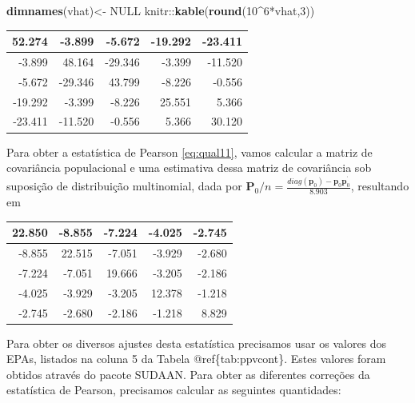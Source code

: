 \documentclass[]{book}
\newenvironment{Shaded}{\begin{snugshade}}{\end{snugshade}}
\newcommand{\KeywordTok}[1]{\textcolor[rgb]{0.13,0.29,0.53}{\textbf{{#1}}}}
\newcommand{\DecValTok}[1]{\textcolor[rgb]{0.00,0.00,0.81}{{#1}}}
\newcommand{\StringTok}[1]{\textcolor[rgb]{0.31,0.60,0.02}{{#1}}}
\newcommand{\OtherTok}[1]{\textcolor[rgb]{0.56,0.35,0.01}{{#1}}}
\newcommand{\NormalTok}[1]{{#1}}
\numberwithin{example}{chapter}
\numberwithin{remark}{chapter}
\numberwithin{definition}{chapter}
\begin{document}
\begin{Shaded}
\begin{Highlighting}[]
\KeywordTok{dimnames}\NormalTok{(vhat)<-}\StringTok{ }\OtherTok{NULL}
\NormalTok{knitr::}\KeywordTok{kable}\NormalTok{(}\KeywordTok{round}\NormalTok{(}\DecValTok{10}\NormalTok{^}\DecValTok{6}\NormalTok{*vhat,}\DecValTok{3}\NormalTok{))}
\end{Highlighting}
\end{Shaded}

\begin{tabular}{r|r|r|r|r}
\hline
52.274 & -3.899 & -5.672 & -19.292 & -23.411\\
\hline
-3.899 & 48.164 & -29.346 & -3.399 & -11.520\\
\hline
-5.672 & -29.346 & 43.799 & -8.226 & -0.556\\
\hline
-19.292 & -3.399 & -8.226 & 25.551 & 5.366\\
\hline
-23.411 & -11.520 & -0.556 & 5.366 & 30.120\\
\hline
\end{tabular}

Para obter a estatística de Pearson \eqref{eq:qual11}, vamos calcular a
matriz de covariância populacional e uma estimativa dessa matriz de
covariância sob suposição de distribuição multinomial, dada por
\(\mathbf{P}_{0}/n=\frac{diag\left( \mathbf{p}_{0}\right) -\mathbf{p}_{0}\mathbf{p}_{0}^{^{\prime }}}{8.903}\),
resultando em

\begin{tabular}{r|r|r|r|r}
\hline
22.850 & -8.855 & -7.224 & -4.025 & -2.745\\
\hline
-8.855 & 22.515 & -7.051 & -3.929 & -2.680\\
\hline
-7.224 & -7.051 & 19.666 & -3.205 & -2.186\\
\hline
-4.025 & -3.929 & -3.205 & 12.378 & -1.218\\
\hline
-2.745 & -2.680 & -2.186 & -1.218 & 8.829\\
\hline
\end{tabular}

Para obter os diversos ajustes desta estatística precisamos usar os
valores dos EPAs, listados na coluna 5 da Tabela @ref\{tab:ppvcont\}.
Estes valores foram obtidos através do pacote SUDAAN. Para obter as
diferentes correções da estatística de Pearson, precisamos calcular as
seguintes quantidades:

\begin{Shaded}
\end{Shaded}
\end{document}
